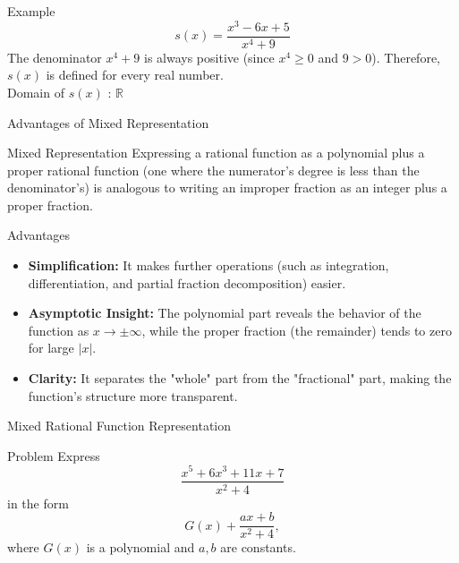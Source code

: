 \begin{frame}{}
  \begin{exampleblock}{Example}
    \[s(x)=\frac{x^3-6x+5}{x^4+9}\]
    The denominator \(x^4+9\) is always positive (since \(x^4\ge 0\) and \(9>0\)). Therefore, \(s(x)\) is defined for every real number. \\
    Domain of \(s(x)\) :
    \(
      \mathbb{R}
    \)
  \end{exampleblock}
\end{frame}

\begin{frame}{Advantages of Mixed Representation}
  \begin{block}{Mixed Representation}
    Expressing a rational function as a polynomial plus a proper rational function (one where the numerator's degree is less than the denominator's) is analogous to writing an improper fraction as an integer plus a proper fraction.
  \end{block}
  \vspace{0.5em}
  \begin{block}{Advantages}
    \begin{itemize}
      \item \textbf{Simplification:} It makes further operations (such as integration, differentiation, and partial fraction decomposition) easier.
      \item \textbf{Asymptotic Insight:} The polynomial part reveals the behavior of the function as \(x\to\pm\infty\), while the proper fraction (the remainder) tends to zero for large \(|x|\).
      \item \textbf{Clarity:} It separates the "whole" part from the "fractional" part, making the function's structure more transparent.
    \end{itemize}
  \end{block}
\end{frame}

\begin{frame}{Mixed Rational Function Representation}
  \begin{exampleblock}{Problem}
    Express
    \[
      \frac{x^5 + 6x^3 + 11x + 7}{x^2+4}
    \]
    in the form
    \[
      G(x) + \frac{ax+b}{x^2+4},
    \]
    where \(G(x)\) is a polynomial and \(a, b\) are constants.
  \end{exampleblock}
\end{frame}

